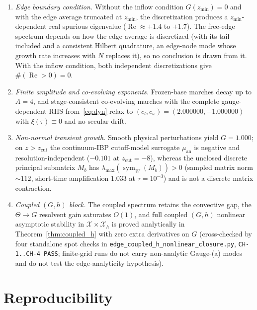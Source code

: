 \documentclass[11pt,a4paper]{article}
\begin{document}
\begin{enumerate}
\item \emph{Edge boundary condition.}
  Without the inflow condition $G(z_{\min})=0$ and with the edge average truncated at $z_{\min}$, the
  discretization produces a $z_{\min}$-dependent real spurious eigenvalue ($\operatorname{Re}\approx +1.4$ to $+1.7$).  The free-edge
  spectrum depends on how the edge average is discretized (with its tail included and a consistent Hilbert quadrature, an
  edge-node mode whose growth rate increases with $N$ replaces it), so no conclusion is drawn from it.
  With the inflow condition, both independent discretizations give $\#(\operatorname{Re}>0)=0$.
\item \emph{Finite amplitude and co-evolving exponents.}
  Frozen-base marches decay up to $A=4$, and stage-consistent co-evolving marches with the
  complete gauge-dependent RHS from~\eqref{eq:dyn} relax to
  $(c_l,c_\omega)=(2.000000,-1.000000)$ with $\xi(\tau)\equiv 0$ and no secular drift.
\item \emph{Non-normal transient growth.}
  Smooth physical perturbations yield $G=1.000$; on $z>z_{\mathrm{cut}}$ the continuum-IBP
  cutoff-model surrogate $\mu_{\mathrm{an}}$ is negative and resolution-independent ($-0.101$
  at $z_{\mathrm{cut}}=-8$), whereas the unclosed discrete principal submatrix $M_b$ has
  $\lambda_{\max}(\operatorname{sym}_W(M_b))>0$ (sampled matrix norm $\sim 112$, short-time
  amplification $1.033$ at $\tau=10^{-3}$) and is not a discrete matrix contraction.
\item \emph{Coupled $(G,h)$ block.}
  The coupled spectrum retains the convective gap, the $\Theta\to G$ resolvent gain saturates $O(1)$,
  and full coupled $(G,h)$ nonlinear asymptotic stability in $\mathcal{X}\times\mathcal{X}_h$ is proved
  analytically in Theorem~\ref{thm:coupled_h} with zero extra derivatives on $G$ (cross-checked by four
  standalone spot checks in \texttt{edge\_coupled\_\allowbreak h\_nonlinear\_\allowbreak closure.py},
  \texttt{CH-1..CH-4 PASS}; finite-grid runs do not carry non-analytic Gauge-(a) modes and do not test
  the edge-analyticity hypothesis).
\end{enumerate}

\section{Reproducibility}
\end{document}
